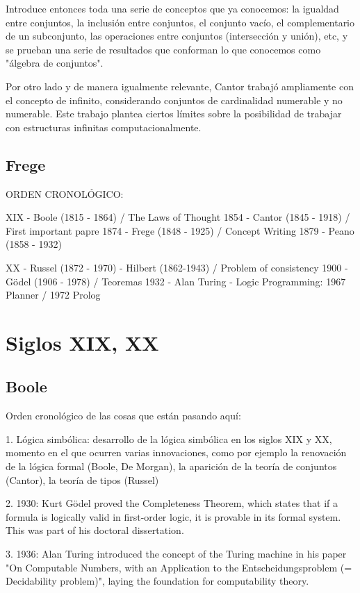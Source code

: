 \documentclass{article}
\begin{document}
Introduce entonces toda una serie de conceptos que ya conocemos: la igualdad entre conjuntos, la inclusión entre conjuntos, el conjunto vacío, el complementario de un subconjunto, las operaciones entre conjuntos (intersección y unión), etc, y se prueban una serie de resultados que conforman lo que conocemos como "álgebra de conjuntos".

Por otro lado y de manera igualmente relevante, Cantor trabajó ampliamente con el concepto de infinito, considerando conjuntos de cardinalidad numerable y no numerable. Este trabajo plantea ciertos límites sobre la posibilidad de trabajar con estructuras infinitas computacionalmente\cite{stoll1979set}.

\subsection{Frege}


ORDEN CRONOLÓGICO:

XIX 
- Boole (1815 - 1864) / The Laws of Thought 1854
- Cantor (1845 - 1918) / First important papre 1874
- Frege (1848 - 1925) / Concept Writing 1879
- Peano (1858 - 1932)



XX
- Russel (1872 - 1970)
- Hilbert (1862-1943) / Problem of consistency 1900
- Gödel (1906 - 1978) / Teoremas 1932
- Alan Turing
- Logic Programming: 1967 Planner / 1972 Prolog

\section{Siglos XIX, XX}

\subsection{Boole}

Orden cronológico de las cosas que están pasando aquí:

1. Lógica simbólica: desarrollo de la
lógica simbólica en los siglos XIX y XX, momento en el que ocurren varias
innovaciones, como por ejemplo la renovación de la lógica formal (Boole, De
Morgan), la aparición de la teoría de conjuntos (Cantor), la teoría de tipos
(Russel)

2. 1930: Kurt Gödel proved the Completeness Theorem, which states that if a formula is logically valid in first-order logic, it is provable in its formal system. This was part of his doctoral dissertation.

3. 1936: Alan Turing introduced the concept of the Turing machine in his paper "On Computable Numbers, with an Application to the Entscheidungsproblem (= Decidability problem)", laying the foundation for computability theory.
\end{document}
